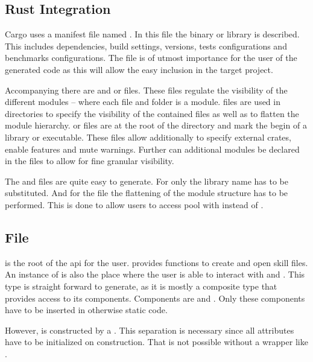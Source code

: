 \documentclass[thesis]{subfiles}
\begin{document}
  \subsection{Rust Integration}
    Cargo uses a manifest file named .
    In this file the binary or library is described.
    This includes dependencies, build settings, versions, tests configurations and benchmarks configurations.
    The file is of utmost importance for the user of the generated code as this will allow the easy inclusion in the target project.
    \autocite[The Manifest Format]{rust-cargo}

    Accompanying there are  and  or  files.
    These files regulate the visibility of the different modules -- where each file and folder is a module.
     files are used in directories to specify the visibility of the contained files as well as to flatten the module hierarchy.
     or  files are at the root of the  directory and mark the begin of a library or executable.
    These files allow additionally to specify external crates, enable features and mute warnings.
    Further can additional modules be declared in the files to allow for fine granular visibility.
    \autocite[7. Modules]{rust-book}

    The  and  files are quite easy to generate.
    For  only the library name has to be substituted.
    And for the  file the flattening of the module structure has to be performed.
    This is done to allow users to access \Foos pool with  instead of .

  \subsection{ File}
    \SkillFile is the root of the \gls{api} for the user.
    \SkillFile provides functions to create and open \gls{skill} files.
    An instance of \SkillFile is also the place where the user is able to interact with \UserTypePools and \StringPool.
    This type is straight forward to generate, as it is mostly a composite type that provides access to its components.
    Components are \UserTypePools and \StringPool.
    Only these components have to be inserted in otherwise static code.

    However, \SkillFile is constructed by a \SkillFileBuilder.
    This separation is necessary since all attributes have to be initialized on construction.
    That is not possible without a wrapper like \OptionT.
\end{document}

